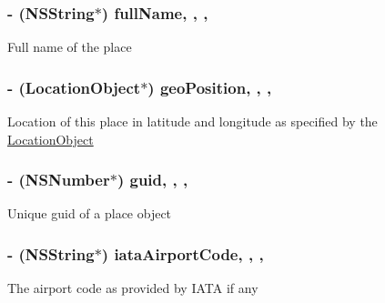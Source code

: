 \subsubsection[{\texorpdfstring{full\+Name}{fullName}}]{\setlength{\rightskip}{0pt plus 5cm}-\/ (N\+S\+String$\ast$) full\+Name\hspace{0.3cm}{\ttfamily [read]}, {\ttfamily [write]}, {\ttfamily [nonatomic]}, {\ttfamily [retain]}}\hypertarget{interface_place_object_ad9712fd279caacdc1e6e859c789a8c89}{}\label{interface_place_object_ad9712fd279caacdc1e6e859c789a8c89}
Full name of the place 
\subsubsection[{\texorpdfstring{geo\+Position}{geoPosition}}]{\setlength{\rightskip}{0pt plus 5cm}-\/ ({\bf Location\+Object}$\ast$) geo\+Position\hspace{0.3cm}{\ttfamily [read]}, {\ttfamily [write]}, {\ttfamily [nonatomic]}, {\ttfamily [retain]}}\hypertarget{interface_place_object_ab64dbbd07e30cb97604bfccb69bb6840}{}\label{interface_place_object_ab64dbbd07e30cb97604bfccb69bb6840}
Location of this place in latitude and longitude as specified by the \hyperlink{interface_location_object}{Location\+Object} 
\subsubsection[{\texorpdfstring{guid}{guid}}]{\setlength{\rightskip}{0pt plus 5cm}-\/ (N\+S\+Number$\ast$) guid\hspace{0.3cm}{\ttfamily [read]}, {\ttfamily [write]}, {\ttfamily [nonatomic]}, {\ttfamily [retain]}}\hypertarget{interface_place_object_af018c73afed3d69e8b4e73399573292b}{}\label{interface_place_object_af018c73afed3d69e8b4e73399573292b}
Unique guid of a place object 
\subsubsection[{\texorpdfstring{iata\+Airport\+Code}{iataAirportCode}}]{\setlength{\rightskip}{0pt plus 5cm}-\/ (N\+S\+String$\ast$) iata\+Airport\+Code\hspace{0.3cm}{\ttfamily [read]}, {\ttfamily [write]}, {\ttfamily [nonatomic]}, {\ttfamily [retain]}}\hypertarget{interface_place_object_a08fa27864c0ab1622fd052775b78359e}{}\label{interface_place_object_a08fa27864c0ab1622fd052775b78359e}
The airport code as provided by I\+A\+TA if any 
